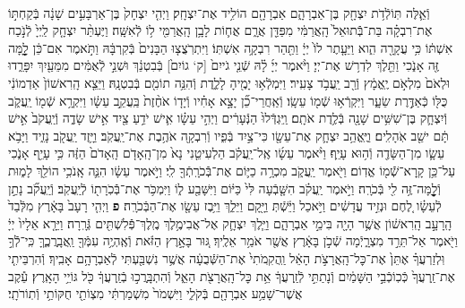 \documentclass[twoside, openany, parskip=half, 11pt]{book}
\begin{document}
\begin{sometimes}
\begin{footnotesize}
\begin{multicols}{2}
\\
וְֿאֵ֛לֶּה תּֽוֹלְֿדֹ֥ת יִצְחָ֖ק בֶּן־אַבְרָהָ֑ם אַבְרָהָ֖ם הוֹלִ֥יד אֶת־יִצְחָֽק׃ וַיְהִ֤י יִצְחָק֙ בֶּן־אַרְבָּעִ֣ים שָׁנָ֔ה בְּֿקַחְתּ֣וֹ אֶת־רִבְקָ֗ה בַּת־בְּֿֿתוּאֵל֙ הָֽאֲרַמִּ֔י מִפַּדַּ֖ן אֲרָ֑ם אֲח֛וֹת לָבָ֥ן הָֽאֲרַמִּ֖י ל֥וֹ לְֿאִשָּֽׁה׃ וַיֶּעְתַּ֨ר יִצְחָ֤ק לַֽיְיָ֙ לְֿנֹ֣כַח אִשְׁתּ֔וֹ כִּ֥י עֲקָרָ֖ה הִ֑וא וַיֵּעָ֤תֶר לוֹ֙ יְיָ֔ וַתַּ֖הַר רִבְקָ֥ה אִשְׁתּֽוֹ׃ וַיִּתְרֹֽצֲצ֤וּ הַבָּנִים֙ בְּֿקִרְבָּ֔הּ וַתֹּ֣אמֶר אִם־כֵּ֔ן לׇׇׇׇׇׇָ֥מָּה זֶּ֖ה אָנֹ֑כִי וַתֵּ֖לֶךְ לִדְר֥שׁ אֶת־יְיָ׃  וַיֹּ֨אמֶר יְיָ֜ לָ֗הּ שְֿׁנֵ֤י גֹייִם֙ [ק‘ גוֹיִם֙] בְּֿבִטְנֵ֔ךְ וּשְׁנֵ֣י לְֿאֻמִּ֔ים מִמֵּעַ֖יִךְ יִפָּרֵ֑דוּ וּלְאֹם֙ מִלְאֹ֣ם יֶֽאֱמָ֔ץ וְֿרַ֖ב יַֽעֲבֹ֥ד צָעִֽיר׃ וַיִּמְלְֿא֥וּ יָמֶ֖יהָ לָלֶ֑דֶת וְֿהִנֵּ֥ה תוֹמִ֖ם בְּֿבִטְנָֽהּ׃ וַיֵּצֵ֤א הָֽרִאשׁוֹן֙ אַדְמוֹנִ֔י כֻּלּ֖וֹ כְּֿאַדֶּ֣רֶת שֵׂעָ֑ר וַיִּקְרְֿא֥וּ שְֿׁמ֖וֹ עֵשָֽׂו׃ וְֿאַֽחֲרֵי־כֵ֞ן יָצָ֣א אָחִ֗יו וְֿיָד֤וֹ אֹחֶ֨זֶת֙ בַּֽעֲקֵ֣ב עֵשָׂ֔ו וַיִּקְרָ֥א שְֿׁמ֖וֹ יַֽעֲקֹ֑ב וְֿיִצְחָ֛ק בֶּן־שִׁשִּׁ֥ים שָׁנָ֖ה בְּֿלֶ֥דֶת אֹתָֽם׃  וַֽיִּגְדְּֿלוּ֙ הַנְּֿעָרִ֔ים וַיְהִ֣י עֵשָׂ֗ו אִ֛ישׁ יֹדֵ֥עַ צַ֖יִד אִ֣ישׁ שָׂדֶ֑ה וְֿיַֽעֲקֹב֙ אִ֣ישׁ תָּ֔ם ישֵׁ֖ב אֹֽהָלִֽים׃ וַיֶּֽאֱהַ֥ב יִצְחָ֛ק אֶת־עֵשָׂ֖ו כִּי־צַ֣יִד בְּֿפִ֑יו וְֿרִבְקָ֖ה אֹהֶ֥בֶת אֶת־יַֽעֲקֹֽב׃ וַיָּ֥זֶד יַֽעֲקֹ֖ב נָזִ֑יד וַיָּבֹ֥א עֵשָׂ֛ו מִן־הַשָּׂדֶ֖ה וְֿה֥וּא עָיֵֽף׃ וַיֹּ֨אמֶר עֵשָׂ֜ו אֶֽל־יַֽעֲקֹ֗ב הַלְעִיטֵ֤נִי נָא֙ מִן־הָֽאָדֹ֤ם הָֽאָדֹם֙ הַזֶּ֔ה כִּ֥י עָיֵ֖ף אָנֹ֑כִי עַל־כֵּ֥ן קָֽרָא־שְֿֿׁמ֖וֹ אֱדֽוֹם׃ וַיֹּ֖אמֶר יַֽעֲקֹ֑ב מִכְרָ֥ה כַיּ֛וֹם אֶת־בְּֿֿכֹרָֽתְֿךָ֖ לִֽי׃ וַיֹּ֣אמֶר עֵשָׂ֔ו הִנֵּ֛ה אָֽנֹכִ֥י הוֹלֵ֖ךְ לָמ֑וּת וְֿלׇׇׇׇׇׇׇׇׇׇׇׇׇׇׇׇָֽמָּה־זֶּ֥ה לִ֖י בְּֿכֹרָֽה׃ וַיֹּ֣אמֶר יַֽעֲקֹ֗ב הִשָּׁ֤בְֿעָה לִּי֙ כַּיּ֔וֹם וַיִּשָּׁבַ֖ע ל֑וֹ וַיִּמְכֹּ֥ר אֶת־בְּֿֿכֹֽרָת֖וֹ לְֿיַֽעֲקֹֽב׃ וְֿיַֽעֲקֹ֞ב נָתַ֣ן לְֿעֵשָׂ֗ו לֶ֚חֶם וּנְזִ֣יד עֲדָשִׁ֔ים וַיֹּ֣אכַל וַיֵּ֔שְֿׁתְּ וַיָּ֖קָם וַיֵּלַ֑ךְ וַיִּ֥בֶז עֵשָׂ֖ו אֶת־הַבְּֿכֹרָֽה׃ \textbf{פ}
וַיְהִ֤י רָעָב֙ בָּאָ֔רֶץ מִלְּֿבַד֙ הָֽרָעָ֣ב הָֽרִאשׁ֔וֹן אֲשֶׁ֥ר הָיָ֖ה בִּימֵ֣י אַבְרָהָ֑ם וַיֵּ֧לֶךְ יִצְחָ֛ק אֶל־אֲבִימֶ֥לֶךְ מֶֽלֶךְ־פְּֿֿלִשְׁתִּ֖ים גְּֿרָֽרָה׃ וַיֵּרָ֤א אֵלָיו֙ יְיָ֔ וַיֹּ֖אמֶר אַל־תֵּרֵ֣ד מִצְרָ֑יְֿמָה שְֿׁכֹ֣ן בָּאָ֔רֶץ אֲשֶׁ֖ר אֹמַ֥ר אֵלֶֽיךָ׃ גּ֚וּר בָּאָ֣רֶץ הַזֹּ֔את וְֿאֶֽהְיֶ֥ה עִמְּֿךָ֖ וַֽאֲבָֽרֲכֶ֑ךָּ כִּֽי־לְֿֿךָ֣ וּֽלְזַרְעֲךָ֗ אֶתֵּן֙ אֶת־כׇּל־הָֽאֲרָצֹ֣ת הָאֵ֔ל וַֽהֲקִֽמֹתִי֙ אֶת־הַשְּֿׁבֻעָ֔ה אֲשֶׁ֥ר נִשְׁבַּ֖עְתִּי לְֿאַבְרָהָ֥ם אָבִֽיךָ׃ וְֿהִרְבֵּיתִ֤י אֶת־זַֽרְעֲךָ֙ כְּֿכֽוֹכְֿבֵ֣י הַשָּׁמַ֔יִם וְֿנָתַתִּ֣י לְֿזַֽרְעֲךָ֔ אֵ֥ת כׇּל־הָֽאֲרָצֹ֖ת הָאֵ֑ל וְֿהִתְבָּֽרֲכ֣וּ בְֿזַֽרְעֲךָ֔ כֹּ֖ל גּוֹיֵ֥י הָאָֽרֶץ׃ עֵ֕קֶב אֲשֶׁר־שָׁמַ֥ע אַבְרָהָ֖ם בְּֿקֹלִ֑י וַיִּשְׁמֹר֙ מִשְׁמַרְתִּ֔י מִצְוֹתַ֖י חֻקּוֹתַ֥י וְֿתֽוֹרֹתָֽי׃


\end{multicols}
\end{footnotesize}
\end{sometimes}
\end{document}
